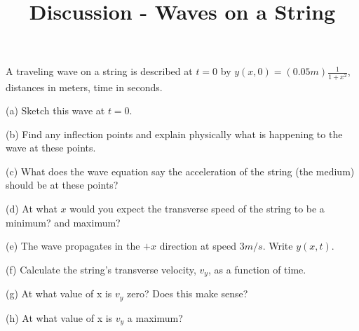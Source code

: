 \documentclass[10pt]{article}
\newenvironment{problem}[2][Problem]{\begin{trivlist}
\item[\hskip \labelsep {\bfseries #1}\hskip \labelsep {\bfseries #2.}]}{\end{trivlist}}
\begin{document}
 \title{Discussion - Waves on a String}
\date{}
\maketitle

\begin{problem}{1}
A traveling wave on a string is described at $t=0$ by $y(x, 0) = (0.05m) \frac{1}{1+x^2}$, distances in meters, time in seconds.
\item (a) Sketch this wave at $t=0$.
\item (b) Find any inflection points and explain physically what is happening to the wave at these points.
\item (c) What does the wave equation say the acceleration of the string (the medium) should be at these points?
\item (d) At what $x$ would you expect the transverse speed of the string to be a minimum? and maximum?
\item (e) The wave propagates in the $+x$ direction at speed $3m/s$. Write $y(x, t)$.
\item (f) Calculate the string's transverse velocity, $v_y$, as a function of time.
\item (g) At what value of x is $v_y$ zero? Does this make sense?
\item (h) At what value of x is $v_y$ a maximum?


\end{problem}








\end{document}
